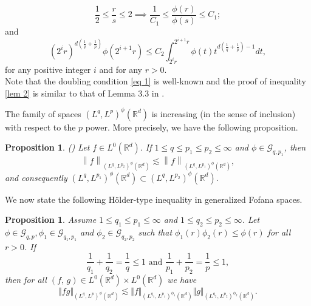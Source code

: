 \documentclass[a4paper,12pt,intlimits,oneside]{amsart}
\numberwithin{equation}{section}
\newtheorem{proposition}[theorem]{Proposition}
\numberwithin{equation}{section}
\theoremstyle{definition}
\begin{document}
 \begin{equation}\label{eq 1}
 \frac{1}{2} \leq \frac{r}{s} \leq 2 \implies \frac{1}{C_1} \leq \frac{\phi (r)}{\phi(s)} \leq C_1;
 \end{equation}
 and  
\begin{equation}
\label{lem 2}
  (2^{i}r)^{d(\frac{1}{q}+\frac{1}{p})} \phi(2^{i+1}r) \leq C_2 \displaystyle\int_{2^{i}r}^{2^{i+1}r} \phi(t)t^{d(\frac{1}{q}+\frac{1}{p})-1} dt, 
 \end{equation}  
for any positive integer $i$ and for any $r>0$.\\
Note that the doubling condition \eqref{eq 1} is well-known and the proof of inequality \eqref{lem 2} is similar to that of Lemma 3.3 in \cite{NKD}.


The family of spaces $ (L^{q},L^{p})^{\phi}(\mathbb{R}^{d}) $ is increasing (in the sense of inclusion) with respect to the $ p $ power. More precisely, we have the following proposition. 
 \begin{proposition}(\cite[Proposition 2.7 (2)]{NKD})
 \label{prop 1}
 Let  $ f \in L^{0}(\mathbb{R}^{d}). $ If $1\leq q\leq p_{1} \leq p_{2} \leq\infty$ and $ \phi \in \mathcal{G}_{q,p_{1}} $, then 
 $$\left\| f \right\|_{(L^{q},L^{p_{2}})^{\phi}(\mathbb{R}^{d})} \lesssim \left\|f\right\|_{(L^{q},L^{p_{1}})^{\phi}(\mathbb{R}^{d})},$$ and consequently $(L^{q},L^{p_{1}})^{\phi}(\mathbb{R}^{d})\subset (L^{q},L^{p_{2}})^{\phi}(\mathbb{R}^{d}).$
 \end{proposition}
We now state the following H\"older-type inequality in generalized Fofana spaces.
\begin{proposition}\label{prop 2}
Assume $1\leq q_{1} \leq p_{1}\leq \infty$ and $1\leq q_{2} \leq p_{2}\leq \infty$.
Let $\phi \in \mathcal{G}_{q,p} , \phi_{1} \in \mathcal{G}_{q_{1},p_{1}} $ and $\phi_{2} \in \mathcal{G}_{q_{2},p_{2}} $ such that $\phi_{1}(r) \phi_{2}(r) \leq \phi(r) $ for all $r>0$. If
	$$\frac{1}{q_{1}} + \frac{1}{q_{2}} = \frac{1}{q} \leq 1  \text{ and } \frac{1}{p_{1}} + \frac{1}{p_{2}} = \frac{1}{p} \leq 1,$$
then for all $(f,\,g) \in L^{0} (\mathbb{R}^{d})\times L^{0} (\mathbb{R}^{d})$ we have
	$$\Vert f g\Vert_{(L^{q},L^{p})^{\phi}(\mathbb{R}^{d})} \lesssim \Vert f \Vert_{(L^{q_{1}},L^{p_{1}})^{\phi_{1}}(\mathbb{R}^{d}) } \Vert g \Vert_{(L^{q_{2}},L^{p_{2}})^{\phi_{2}}(\mathbb{R}^{d})}.$$
\end{proposition}
\end{document}
